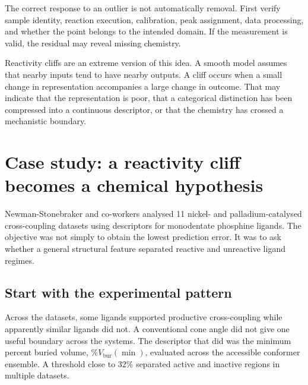 
The correct response to an outlier is not automatically removal.
First verify sample identity, reaction execution, calibration, peak assignment, data processing, and whether the point belongs to the intended domain.
If the measurement is valid, the residual may reveal missing chemistry.

Reactivity cliffs are an extreme version of this idea.
A smooth model assumes that nearby inputs tend to have nearby outputs.
A cliff occurs when a small change in representation accompanies a large change in outcome.
That may indicate that the representation is poor, that a categorical distinction has been compressed into a continuous descriptor, or that the chemistry has crossed a mechanistic boundary.

\section{Case study: a reactivity cliff becomes a chemical hypothesis}

Newman-Stonebraker and co-workers analysed 11 nickel- and palladium-catalysed cross-coupling datasets using descriptors for monodentate phosphine ligands.
The objective was not simply to obtain the lowest prediction error.
It was to ask whether a general structural feature separated reactive and unreactive ligand regimes.

\subsection{Start with the experimental pattern}

Across the datasets, some ligands supported productive cross-coupling while apparently similar ligands did not.
A conventional cone angle did not give one useful boundary across the systems.
The descriptor that did was the minimum percent buried volume, $\%V_{\mathrm{bur}}(\min)$, evaluated across the accessible conformer ensemble.
A threshold close to $32\%$ separated active and inactive regions in multiple datasets.

